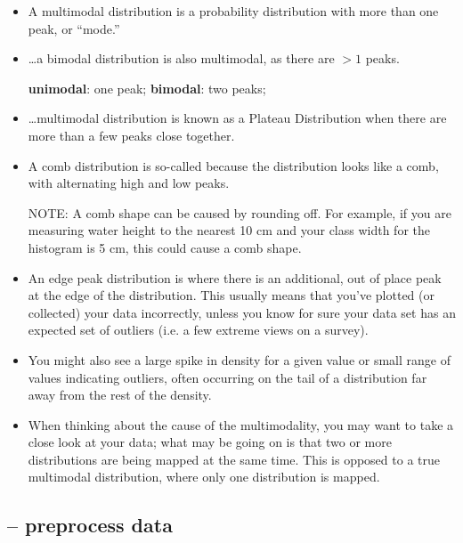 \begin{itemize}
  
  \item  A multimodal distribution is a probability distribution with more than
  one peak, or “mode.” 
  
  
  \item \ldots a bimodal distribution is also multimodal, as there are $>1$ peaks.
  
  {\bf unimodal}: one peak; {\bf bimodal}: two peaks; 
  
  \item \ldots  multimodal distribution is known as a Plateau Distribution when
  there are more than a few peaks close together.
  
  \item A comb distribution is so-called because the distribution looks like a
  comb, with alternating high and low peaks.
  
  NOTE: A comb shape can be caused by rounding off. For example, if you are
  measuring water height to the nearest 10 cm and your class width for the
  histogram is 5 cm, this could cause a comb shape.
  
  \item An edge peak distribution is where there is an additional, out of place
  peak at the edge of the distribution. This usually means that you’ve plotted
  (or collected) your data incorrectly, unless you know for sure your data set
  has an expected set of outliers (i.e. a few extreme views on a survey).
  
  \item You might also see a large spike in density for a given value or small
  range of values indicating outliers, often occurring on the tail of a
  distribution far away from the rest of the density.
  
  
  \item When thinking about the cause of the multimodality, you may want to take
  a close look at your data; what may be going on is that two or more
  distributions are being mapped at the same time. This is opposed to a true
  multimodal distribution, where only one distribution is mapped.
  
\end{itemize}

\subsection{-- preprocess data}
\label{sec:pre-processing-data}

